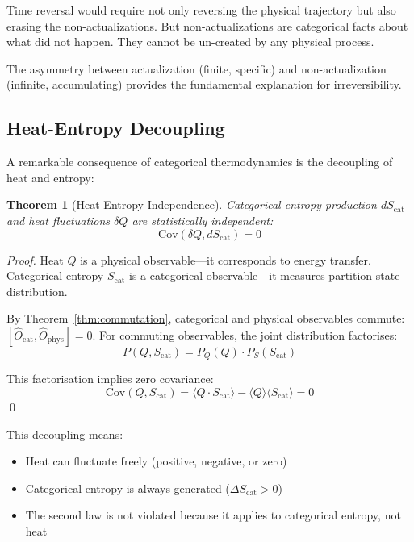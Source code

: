 \documentclass[twocolumn,10pt,aps,prd,superscriptaddress,nofootinbib]{revtex4-2}
\newtheorem{theorem}{Theorem}[section]
\theoremstyle{remark}
\newcommand{\Scat}{S_{\mathrm{cat}}}
\newcommand{\Ocat}{\hat{O}_{\mathrm{cat}}}
\newcommand{\Ophys}{\hat{O}_{\mathrm{phys}}}
\begin{document}
Time reversal would require not only reversing the physical trajectory but also erasing the non-actualizations. But non-actualizations are categorical facts about what did not happen. They cannot be un-created by any physical process.

The asymmetry between actualization (finite, specific) and non-actualization (infinite, accumulating) provides the fundamental explanation for irreversibility.

\subsection{Heat-Entropy Decoupling}

A remarkable consequence of categorical thermodynamics is the decoupling of heat and entropy:

\begin{theorem}[Heat-Entropy Independence]
\label{thm:heat_entropy}
Categorical entropy production $d\Scat$ and heat fluctuations $\delta Q$ are statistically independent:
\begin{equation}
\text{Cov}(\delta Q, d\Scat) = 0
\label{eq:heat_entropy_independence}
\end{equation}
\end{theorem}

\begin{proof}
Heat $Q$ is a physical observable---it corresponds to energy transfer. Categorical entropy $\Scat$ is a categorical observable---it measures partition state distribution.

By Theorem~\ref{thm:commutation}, categorical and physical observables commute: $[\Ocat, \Ophys] = 0$. For commuting observables, the joint distribution factorises:
\begin{equation}
P(Q, \Scat) = P_Q(Q) \cdot P_S(\Scat)
\end{equation}

This factorisation implies zero covariance:
\begin{equation}
\text{Cov}(Q, \Scat) = \langle Q \cdot \Scat \rangle - \langle Q \rangle \langle \Scat \rangle = 0
\end{equation}
\qed
\end{proof}

This decoupling means:
\begin{itemize}
\item Heat can fluctuate freely (positive, negative, or zero)
\item Categorical entropy is always generated ($\Delta \Scat > 0$)
\item The second law is not violated because it applies to categorical entropy, not heat
\end{itemize}
\end{document}
